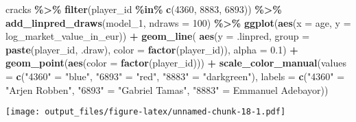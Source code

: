 \documentclass[
]{article}
\newenvironment{Shaded}{\begin{snugshade}}{\end{snugshade}}
\newcommand{\AttributeTok}[1]{\textcolor[rgb]{0.13,0.29,0.53}{#1}}
\newcommand{\DecValTok}[1]{\textcolor[rgb]{0.00,0.00,0.81}{#1}}
\newcommand{\FloatTok}[1]{\textcolor[rgb]{0.00,0.00,0.81}{#1}}
\newcommand{\FunctionTok}[1]{\textcolor[rgb]{0.13,0.29,0.53}{\textbf{#1}}}
\newcommand{\NormalTok}[1]{#1}
\newcommand{\OtherTok}[1]{\textcolor[rgb]{0.56,0.35,0.01}{#1}}
\newcommand{\SpecialCharTok}[1]{\textcolor[rgb]{0.81,0.36,0.00}{\textbf{#1}}}
\newcommand{\StringTok}[1]{\textcolor[rgb]{0.31,0.60,0.02}{#1}}
\begin{document}
\begin{Shaded}
\begin{Highlighting}[]
\NormalTok{cracks }\SpecialCharTok{\%\textgreater{}\%}
  \FunctionTok{filter}\NormalTok{(player\_id }\SpecialCharTok{\%in\%} \FunctionTok{c}\NormalTok{(}\DecValTok{4360}\NormalTok{, }\DecValTok{8883}\NormalTok{, }\DecValTok{6893}\NormalTok{)) }\SpecialCharTok{\%\textgreater{}\%}
  \FunctionTok{add\_linpred\_draws}\NormalTok{(model\_1, }\AttributeTok{ndraws =} \DecValTok{100}\NormalTok{) }\SpecialCharTok{\%\textgreater{}\%}
  \FunctionTok{ggplot}\NormalTok{(}\FunctionTok{aes}\NormalTok{(}\AttributeTok{x =}\NormalTok{ age, }\AttributeTok{y =}\NormalTok{ log\_market\_value\_in\_eur)) }\SpecialCharTok{+}
  \FunctionTok{geom\_line}\NormalTok{(}
    \FunctionTok{aes}\NormalTok{(}\AttributeTok{y =}\NormalTok{ .linpred, }\AttributeTok{group =} \FunctionTok{paste}\NormalTok{(player\_id, .draw), }\AttributeTok{color =} \FunctionTok{factor}\NormalTok{(player\_id)),}
    \AttributeTok{alpha =} \FloatTok{0.1}\NormalTok{) }\SpecialCharTok{+}
  \FunctionTok{geom\_point}\NormalTok{(}\FunctionTok{aes}\NormalTok{(}\AttributeTok{color =} \FunctionTok{factor}\NormalTok{(player\_id))) }\SpecialCharTok{+}
  \FunctionTok{scale\_color\_manual}\NormalTok{(}\AttributeTok{values =} \FunctionTok{c}\NormalTok{(}\StringTok{"4360"} \OtherTok{=} \StringTok{"blue"}\NormalTok{, }\StringTok{"6893"} \OtherTok{=} \StringTok{"red"}\NormalTok{, }\StringTok{"8883"} \OtherTok{=} \StringTok{"darkgreen"}\NormalTok{), }\AttributeTok{labels =} \FunctionTok{c}\NormalTok{(}\StringTok{"4360"} \OtherTok{=} \StringTok{"Arjen Robben"}\NormalTok{, }\StringTok{"6893"} \OtherTok{=} \StringTok{"Gabriel Tamas"}\NormalTok{, }\StringTok{"8883"} \OtherTok{=} \StringTok{\textquotesingle{}Emmanuel Adebayor\textquotesingle{}}\NormalTok{))}
\end{Highlighting}
\end{Shaded}

\texttt{[image: output\_files/figure-latex/unnamed-chunk-18-1.pdf]}
\end{document}
